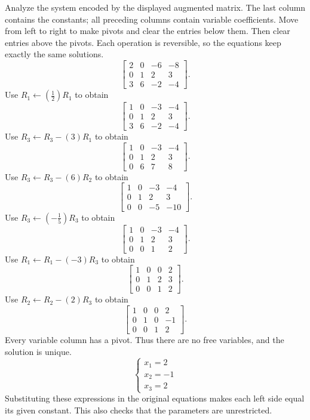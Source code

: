 \goal Analyze the system encoded by the displayed augmented matrix. The last column contains the constants; all preceding columns contain variable coefficients.
\idea Move from left to right to make pivots and clear the entries below them. Then clear entries above the pivots. Each operation is reversible, so the equations keep exactly the same solutions.
\[ \left[\begin{array}{rrr|r}2&0&-6&-8\\0&1&2&3\\3&6&-2&-4\end{array}\right].\]
Use $R_{1}\leftarrow(\frac{1}{2})R_{1}$ to obtain
\[ \left[\begin{array}{rrr|r}1&0&-3&-4\\0&1&2&3\\3&6&-2&-4\end{array}\right].\]
Use $R_{3}\leftarrow R_{3}-(3)R_{1}$ to obtain
\[ \left[\begin{array}{rrr|r}1&0&-3&-4\\0&1&2&3\\0&6&7&8\end{array}\right].\]
Use $R_{3}\leftarrow R_{3}-(6)R_{2}$ to obtain
\[ \left[\begin{array}{rrr|r}1&0&-3&-4\\0&1&2&3\\0&0&-5&-10\end{array}\right].\]
Use $R_{3}\leftarrow(- \frac{1}{5})R_{3}$ to obtain
\[ \left[\begin{array}{rrr|r}1&0&-3&-4\\0&1&2&3\\0&0&1&2\end{array}\right].\]
Use $R_{1}\leftarrow R_{1}-(-3)R_{3}$ to obtain
\[ \left[\begin{array}{rrr|r}1&0&0&2\\0&1&2&3\\0&0&1&2\end{array}\right].\]
Use $R_{2}\leftarrow R_{2}-(2)R_{3}$ to obtain
\[ \left[\begin{array}{rrr|r}1&0&0&2\\0&1&0&-1\\0&0&1&2\end{array}\right].\]
Every variable column has a pivot. Thus there are no free variables, and the solution is unique.
\[ \begin{cases}x_{1}=2\\x_{2}=-1\\x_{3}=2\end{cases}\]
Substituting these expressions in the original equations makes each left side equal its given constant. This also checks that the parameters are unrestricted.

